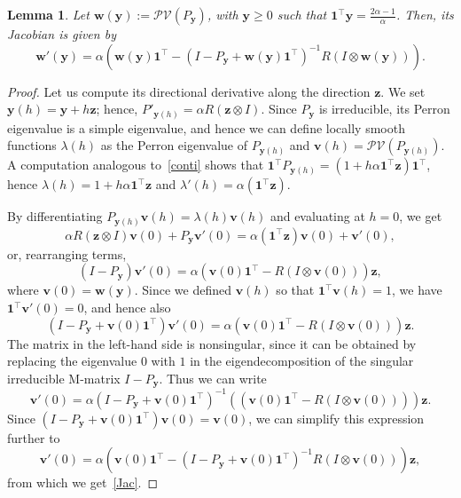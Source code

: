 \documentclass[10pt]{paper}
\newtheorem{lemma}[theorem]{Lemma}
\begin{document}
\begin{lemma}
Let ${\mathbf{w}}({\mathbf{y}}):= \mathcal{PV}(P_{\mathbf{y}})$, with ${\mathbf{y}}\ge0$ such that ${\mathbf{1}}^\top {\mathbf{y}} = \frac{2\alpha-1}{\alpha}$. Then, its Jacobian is given by
\begin{equation} \label{Jac}
	{\mathbf{w}}'({\mathbf{y}}) = \alpha \left( {\mathbf{w}}({\mathbf{y}}) {\mathbf{1}}^\top - (I-P_{\mathbf{y}} + {\mathbf{w}}({\mathbf{y}}){\mathbf{1}}^\top)^{-1}R(I\otimes {\mathbf{w}}({\mathbf{y}}))\right).
\end{equation}
\end{lemma}
\begin{proof}
Let us compute its directional derivative along the direction ${\mathbf{z}}$. We set ${\mathbf{y}}(h) = {\mathbf{y}}+h{\mathbf{z}}$; hence, $P'_{{\mathbf{y}}(h)} = \alpha R ({\mathbf{z}} \otimes I)$. Since $P_{\mathbf{y}}$ is irreducible, its Perron eigenvalue is a simple eigenvalue, and hence we can define locally smooth functions $\lambda(h)$ as the Perron eigenvalue of $P_{{\mathbf{y}}(h)}$ and ${\mathbf{v}}(h)=\mathcal{PV}(P_{{\mathbf{y}}(h)})$.
A computation analogous to~\eqref{conti} shows that ${\mathbf{1}}^\top P_{{\mathbf{y}}(h)} = (1+ h \alpha {\mathbf{1}}^\top{\mathbf{z}}){\mathbf{1}}^\top$, hence $\lambda(h) = 1+ h \alpha {\mathbf{1}}^\top{\mathbf{z}}$ and $\lambda'(h) = \alpha ({\mathbf{1}}^\top {\mathbf{z}})$.

By differentiating $P_{{\mathbf{y}}(h)}{\mathbf{v}}(h) = \lambda(h){\mathbf{v}}(h)$ and evaluating at $h=0$, we get
 \[
\alpha R ({\mathbf{z}} \otimes I){\mathbf{v}}(0) + P_{\mathbf{y}} {\mathbf{v}}'(0) = \alpha ({\mathbf{1}}^\top {\mathbf{z}}) {\mathbf{v}}(0) + {\mathbf{v}}'(0),
 \]
or, rearranging terms,
\[
(I-P_{\mathbf{y}}){\mathbf{v}}'(0) = \alpha ({\mathbf{v}}(0) {\mathbf{1}}^\top - R(I\otimes {\mathbf{v}}(0))){\mathbf{z}},
\]
where ${\mathbf{v}}(0)={\mathbf{w}}({\mathbf{y}})$.
Since we defined ${\mathbf{v}}(h)$ so that ${\mathbf{1}}^\top {\mathbf{v}}(h)=1$, we have ${\mathbf{1}}^\top {\mathbf{v}}'(0)=0$, and hence also
\[
(I-P_{\mathbf{y}} + {\mathbf{v}}(0){\mathbf{1}}^\top){\mathbf{v}}'(0) = \alpha \left({\mathbf{v}}(0) {\mathbf{1}}^\top - R(I\otimes {\mathbf{v}}(0))\right){\mathbf{z}}.
\]
The matrix in the left-hand side is nonsingular, since it can be obtained by replacing the eigenvalue $0$ with $1$ in the eigendecomposition of the singular irreducible M-matrix $I-P_{\mathbf{y}}$. Thus we can write 
\[
{\mathbf{v}}'(0) = \alpha(I-P_{\mathbf{y}} + {\mathbf{v}}(0){\mathbf{1}}^\top)^{-1}\left( ({\mathbf{v}}(0) {\mathbf{1}}^\top - R(I\otimes {\mathbf{v}}(0)))\right){\mathbf{z}}.
\]
 Since $(I-P_{\mathbf{y}} + {\mathbf{v}}(0){\mathbf{1}}^\top) {\mathbf{v}}(0) = {\mathbf{v}}(0)$, we can simplify this expression further to
\[
{\mathbf{v}}'(0) = \alpha\left(  {\mathbf{v}}(0) {\mathbf{1}}^\top - (I-P_{\mathbf{y}} + {\mathbf{v}}(0){\mathbf{1}}^\top)^{-1}R(I\otimes {\mathbf{v}}(0)) \right){\mathbf{z}},
\]
from which we  get~\eqref{Jac}.
\end{proof}
\end{document}
